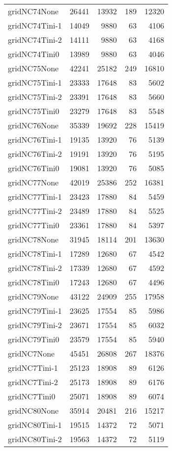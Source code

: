 \begin{longtable}{lrrrr}
gridNC74None & 26441 & 13932 & 189 & 12320 \\
gridNC74Tini-1 & 14049 & 9880 & 63 & 4106 \\
gridNC74Tini-2 & 14111 & 9880 & 63 & 4168 \\
gridNC74Tini0 & 13989 & 9880 & 63 & 4046 \\
gridNC75None & 42241 & 25182 & 249 & 16810 \\
gridNC75Tini-1 & 23333 & 17648 & 83 & 5602 \\
gridNC75Tini-2 & 23391 & 17648 & 83 & 5660 \\
gridNC75Tini0 & 23279 & 17648 & 83 & 5548 \\
gridNC76None & 35339 & 19692 & 228 & 15419 \\
gridNC76Tini-1 & 19135 & 13920 & 76 & 5139 \\
gridNC76Tini-2 & 19191 & 13920 & 76 & 5195 \\
gridNC76Tini0 & 19081 & 13920 & 76 & 5085 \\
gridNC77None & 42019 & 25386 & 252 & 16381 \\
gridNC77Tini-1 & 23423 & 17880 & 84 & 5459 \\
gridNC77Tini-2 & 23489 & 17880 & 84 & 5525 \\
gridNC77Tini0 & 23361 & 17880 & 84 & 5397 \\
gridNC78None & 31945 & 18114 & 201 & 13630 \\
gridNC78Tini-1 & 17289 & 12680 & 67 & 4542 \\
gridNC78Tini-2 & 17339 & 12680 & 67 & 4592 \\
gridNC78Tini0 & 17243 & 12680 & 67 & 4496 \\
gridNC79None & 43122 & 24909 & 255 & 17958 \\
gridNC79Tini-1 & 23625 & 17554 & 85 & 5986 \\
gridNC79Tini-2 & 23671 & 17554 & 85 & 6032 \\
gridNC79Tini0 & 23579 & 17554 & 85 & 5940 \\
gridNC7None & 45451 & 26808 & 267 & 18376 \\
gridNC7Tini-1 & 25123 & 18908 & 89 & 6126 \\
gridNC7Tini-2 & 25173 & 18908 & 89 & 6176 \\
gridNC7Tini0 & 25071 & 18908 & 89 & 6074 \\
gridNC80None & 35914 & 20481 & 216 & 15217 \\
gridNC80Tini-1 & 19515 & 14372 & 72 & 5071 \\
gridNC80Tini-2 & 19563 & 14372 & 72 & 5119 \\

\end{longtable}
